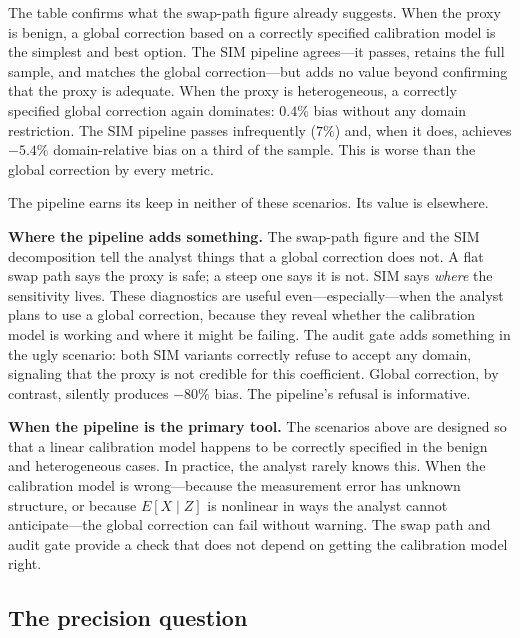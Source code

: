 \documentclass[11pt]{article}
\newcommand{\1}{\mathbf{1}}
\begin{document}
The table confirms what the swap-path figure already suggests. When the proxy is benign, a global correction based on a correctly specified calibration model is the simplest and best option. The SIM pipeline agrees---it passes, retains the full sample, and matches the global correction---but adds no value beyond confirming that the proxy is adequate. When the proxy is heterogeneous, a correctly specified global correction again dominates: $0.4\%$ bias without any domain restriction. The SIM pipeline passes infrequently ($7\%$) and, when it does, achieves $-5.4\%$ domain-relative bias on a third of the sample. This is worse than the global correction by every metric.

The pipeline earns its keep in neither of these scenarios. Its value is elsewhere.

\textbf{Where the pipeline adds something.} The swap-path figure and the SIM decomposition tell the analyst things that a global correction does not. A flat swap path says the proxy is safe; a steep one says it is not. SIM says \emph{where} the sensitivity lives. These diagnostics are useful even---especially---when the analyst plans to use a global correction, because they reveal whether the calibration model is working and where it might be failing. The audit gate adds something in the ugly scenario: both SIM variants correctly refuse to accept any domain, signaling that the proxy is not credible for this coefficient. Global correction, by contrast, silently produces $-80\%$ bias. The pipeline's refusal is informative.

\textbf{When the pipeline is the primary tool.} The scenarios above are designed so that a linear calibration model happens to be correctly specified in the benign and heterogeneous cases. In practice, the analyst rarely knows this. When the calibration model is wrong---because the measurement error has unknown structure, or because $E[X\mid Z]$ is nonlinear in ways the analyst cannot anticipate---the global correction can fail without warning. The swap path and audit gate provide a check that does not depend on getting the calibration model right.

\subsection{The precision question}
\end{document}
